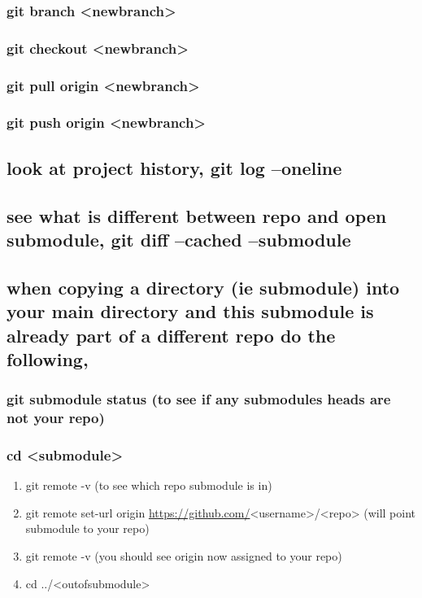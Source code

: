 \documentclass[11pt]{article}
\begin{document}
\subsubsection{git branch <newbranch>}
\label{sec:org2767cf4}
\subsubsection{git checkout <newbranch>}
\label{sec:orgde18a97}
\subsubsection{git pull origin <newbranch>}
\label{sec:org97a084c}
\subsubsection{git push origin <newbranch>}
\label{sec:org43bb6cc}
\subsection{look at project history, git log --oneline}
\label{sec:orgf528da1}
\subsection{see what is different between repo and open submodule, git diff --cached --submodule}
\label{sec:org3242484}
\subsection{when copying a directory (ie submodule) into your main directory and this submodule is already part of a different repo do the following,}
\label{sec:orga6700fd}
\subsubsection{git submodule status (to see if any submodules heads are not your repo)}
\label{sec:org3dd7677}
\subsubsection{cd <submodule>}
\label{sec:orge0ade86}
\begin{enumerate}
\item git remote -v (to see which repo submodule is in)
\label{sec:orga9ffda3}
\item git remote set-url origin \url{https://github.com/}<username>/<repo> (will point submodule to your repo)
\label{sec:org391ef0d}
\item git remote -v (you should see origin now assigned to your repo)
\label{sec:org743a38a}
\item cd ../<outofsubmodule>
\label{sec:org1374159}
\end{enumerate}
\end{document}
